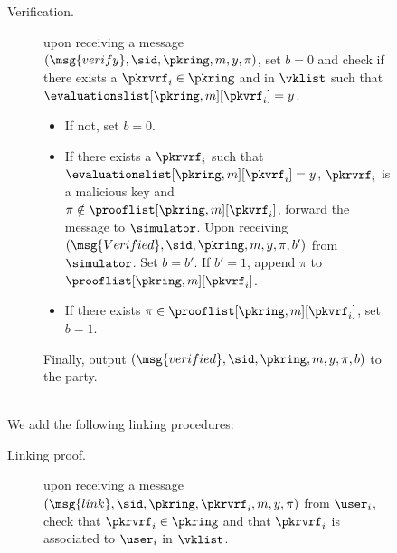 \begin{figure}
\begin{tcolorbox}
{\begin{description}
				
				\item[Verification.] upon receiving a message $(\msg{verify}, \sid, \pkring, m, y, \pi)$, set $ b = 0 $ and check if there exists a  $\pkrvrf_i \in \pkring$ and  in $ \vklist $ such that $ \evaluationslist[\pkring,m][\pkvrf_i] = y $. 
				\begin{itemize}
					\item If not, set $ b = 0 $.
					\item If there exists a $ \pkrvrf_i $ such that $ \evaluationslist[\pkring,m][\pkvrf_i] = y$, $ \pkrvrf_i $ is a malicious key and   $\pi \notin \prooflist[\pkring, m][\pkvrf_i]$, forward the message to $ \simulator $. Upon receiving $ (\msg{Verified}, \sid,\pkring, m, y, \pi, b') $ from $ \simulator $. Set $ b = b' $. If $ b' = 1 $, append $ \pi $ to $ \prooflist[\pkring, m][\pkvrf_i] $.
					\item If there exists $\pi \in \prooflist[\pkring, m][\pkvrf_i]$, set $b = 1$.
				\end{itemize}
				 Finally, output $(\msg{verified}, \sid, \pkring, m, y, \pi, b)$ to the party.
			\end{description}
			\par\hrulefill\\
			We add the following linking procedures:
			\begin{description}
				\item[Linking proof.] upon receiving a message $(\msg{link}, \sid, \pkring, \pkrvrf_i, m, y,\pi)$ from $\user_i$, check that $\pkrvrf_i \in \pkring$ and that $\pkrvrf_i $ is associated to $\user_i$ in $ \vklist $. 

\end{description}}
\end{tcolorbox}
\end{figure}
